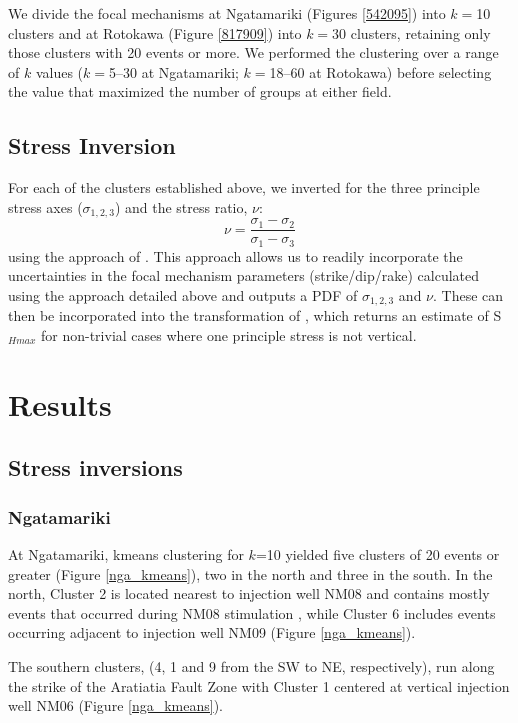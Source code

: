 We divide the focal mechanisms at Ngatamariki (Figures \ref{542095}) into $k=$10 clusters and at Rotokawa (Figure \ref{817909}) into $k=$30 clusters, retaining only those clusters with 20 events or more. We performed the clustering over a range of $k$ values ($k=$5--30 at Ngatamariki; $k=$18--60 at Rotokawa) before selecting the value that maximized the number of groups at either field.

\subsection{Stress Inversion}
For each of the clusters established above, we inverted for the three principle stress axes ($\sigma_{1,2,3}$) and the stress ratio, $\nu$:
\begin{equation}
    \nu = \frac{\sigma_{1} - \sigma_{2}}{\sigma_{1} - \sigma_{3}}
\end{equation}
using the approach of \citet{Arnold_2007}. This approach allows us to readily incorporate the uncertainties in the focal mechanism parameters (strike/dip/rake) calculated using the approach detailed above and outputs a PDF of $\sigma_{1,2,3}$ and $\nu$. These can then be incorporated into the transformation of \citet{Lund_2007}, which returns an estimate of S$_{Hmax}$ for non-trivial cases where one principle stress is not vertical.

\section{Results}\label{results}
\subsection{Stress inversions}
\subsubsection{Ngatamariki}
At Ngatamariki, kmeans clustering for $k$=10 yielded five clusters of 20 events or greater (Figure \ref{nga_kmeans}), two in the north and three in the south. In the north, Cluster 2 is located nearest to injection well NM08 and contains mostly events that occurred during NM08 stimulation \citep{j2019}, while Cluster 6 includes events occurring adjacent to injection well NM09 (Figure \ref{nga_kmeans}).

The southern clusters, (4, 1 and 9 from the SW to NE, respectively), run along the strike of the Aratiatia Fault Zone with Cluster 1 centered at vertical injection well NM06 (Figure \ref{nga_kmeans}).


